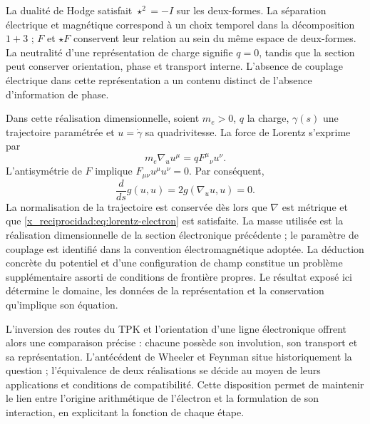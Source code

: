 La dualité de Hodge satisfait \(\star^2=-I\) sur les deux-formes. La séparation électrique et magnétique correspond à un choix temporel dans la décomposition \(1+3\) ; \(F\) et \(\star F\) conservent leur relation au sein du même espace de deux-formes. La neutralité d'une représentation de charge signifie \(q=0\), tandis que la section peut conserver orientation, phase et transport interne. L'absence de couplage électrique dans cette représentation a un contenu distinct de l'absence d'information de phase.

Dans cette réalisation dimensionnelle, soient \(m_e>0\), \(q\) la charge,
\(\gamma(s)\) une trajectoire paramétrée et \(u=\dot\gamma\)
sa quadrivitesse. La force de Lorentz s'exprime par
\begin{equation}
 m_e\nabla_u u^\mu=qF^\mu{}_{\nu}u^\nu.
 \label{x_reciprocidad:eq:lorentz-electron}
\end{equation}
L'antisymétrie de \(F\) implique
\(F_{\mu\nu}u^\mu u^\nu=0\). Par conséquent,
\[
 \frac{d}{ds}g(u,u)=2g(\nabla_u u,u)=0.
\]
La normalisation de la trajectoire est conservée dès lors que \(\nabla\)
est métrique et que \eqref{x_reciprocidad:eq:lorentz-electron} est satisfaite. La masse utilisée
est la réalisation dimensionnelle de la section électronique précédente ;
le paramètre de couplage est identifié dans la convention électromagnétique
adoptée. La déduction concrète du potentiel et d'une configuration
de champ constitue un problème supplémentaire assorti de conditions de frontière
propres. Le résultat exposé ici détermine le domaine, les données
de la représentation et la conservation qu'implique son équation.

L'inversion des routes du TPK et l'orientation d'une ligne électronique
offrent alors une comparaison précise : chacune possède son involution,
son transport et sa représentation. L'antécédent de Wheeler et Feynman
situe historiquement la question ; l'équivalence de deux réalisations
se décide au moyen de leurs applications et conditions de compatibilité.
Cette disposition permet de maintenir le lien entre l'origine arithmétique de l'électron
et la formulation de son interaction, en explicitant la fonction
de chaque étape.


